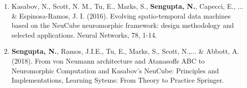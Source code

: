\begin{tcolorbox}[colback=black!5,colframe=black!40!black,title=Publications]
	\begin{enumerate}
		\item Kasabov, N., Scott, N. M., Tu, E., Marks, S., \textbf{Sengupta, N.}, Capecci, E., ... \& Espinosa-Ramos, J. I. (2016). Evolving spatio-temporal data machines based on the NeuCube neuromorphic framework: design methodology and selected applications. Neural Networks, 78, 1-14.
		\item \textbf{Sengupta, N.}, Ramos, J.I.E., Tu, E., Marks, S., Scott, N.,... \& Abbott, A. (2018). From von Neumann architecture and Atanasoffs ABC to Neuromorphic Computation and Kasabov’s NeuCube: Principles and Implementations, Learning Sytems: From Theory to Practice Springer.
	\end{enumerate}
\end{tcolorbox}

